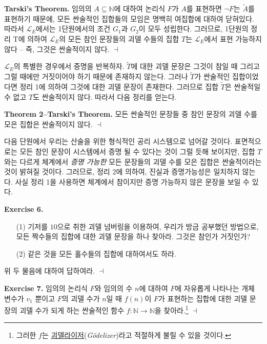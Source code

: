 \documentclass[12pt]{paper}
\newenvironment{context}[1][]
{ \noindent \textbf{{#1}.} }
{ \hfill $ \dashv $ }
\begin{document}
\begin{context}[Tarski's Theorem]
임의의 $A \subseteq \mathbb{N}$에 대하여 논리식 $F$가 $A$를 표현하면 $\lnot F$는 $\widetilde{A}$를 표현하기 때문에,
모든 싼술적인 집합들의 모임은 명백히 여집합에 대하여 닫혀있다.
따라서 $\mathcal{L}_{E}$에서는 1단원에서의 조건 $G_1$과 $G_2$이 모두 성립한다.
그러므로, 1단원의 정리 T에 의하여 $\mathcal{L}_{E}$의 모든 참인 문장들의 괴델 수들의 집합 $T$는 $\mathcal{L}_{E}$에서 표현 가능하지 않다 --
즉, 그것은 싼술적이지 않다.
\end{context}

$\mathcal{L}_{E}$의 특별한 경우에서 증명을 반복하자.
$\widetilde{T}$에 대한 괴델 문장은 그것이 참일 때 그리고 그럴 때에만 거짓이어야 하기 때문에 존재하지 않는다.
그러나 $\widetilde{T}$가 싼술적인 집합이었다면 정리 1에 의하여 그것에 대한 괴델 문장이 존재한다.
그러므로 집합 $\widetilde{T}$은 싼술적일 수 없고 $T$도 싼술적이지 않다.
따라서 다음 정리를 얻는다.

\begin{context}[Theorem 2--Tarski's Theorem]
모든 싼술적인 문장들 중 참인 문장의 괴델 수를 모은 집합은 싼술적이지 않다.
\end{context}

다음 단원에서 우리는 산술을 위한 형식적인 공리 시스템으로 넘어갈 것이다.
표면적으로는 모든 참인 문장이 시스템에서 증명 될 수 있다는 것이 그럴 듯해 보이지만,
집합 $T$와는 다르게 체계에서 \textit{증명 가능한} 모든 문장들의 괴델 수를 모은 집합은 싼술적이라는 것이 밝혀질 것이다.
그러므로, 정리 2에 의하여, 진실과 증명가능성은 일치하지 않는다.
사실 정리 1을 사용하면 체계에서 참이지만 증명 가능하지 않은 문장을 보일 수 있다.

\begin{context}[Exercise 6]
\begin{enumerate}
\item[(1)] 기저를 $10$으로 취한 괴델 넘버링을 이용하여, 우리가 방금 공부했던 방법으로, 모든 짝수들의 집합에 대한 괴델 문장을 하나 찾아라.
그것은 참인가 거짓인가?
\item[(2)] 같은 것을 모든 홀수들의 집합에 대하여서도 하라.
\end{enumerate}

위 두 물음에 대하여 답하여라.
\end{context}

\begin{context}[Exercise 7]
임의의 논리식 $F$와 임의의 수 $n$에 대하여 $F$에 자유롭게 나타나는 개체 변수가 $v_1$ 뿐이고 $F$의 괴델 수가 $n$일 때 $f \left( n \right)$이 $F$가 표현하는 집합에 대한 괴델 문장의 괴델 수가 되게 하는 싼술적인 함수 $f : \mathbb{N} \to \mathbb{N}$을 찾아라.\footnote
{
그러한 $f$는 \underline{괴델라이저}(\textit{G\"odelizer})라고 적절하게 불릴 수 있을 것이다.
}
\end{context}
\end{document}

